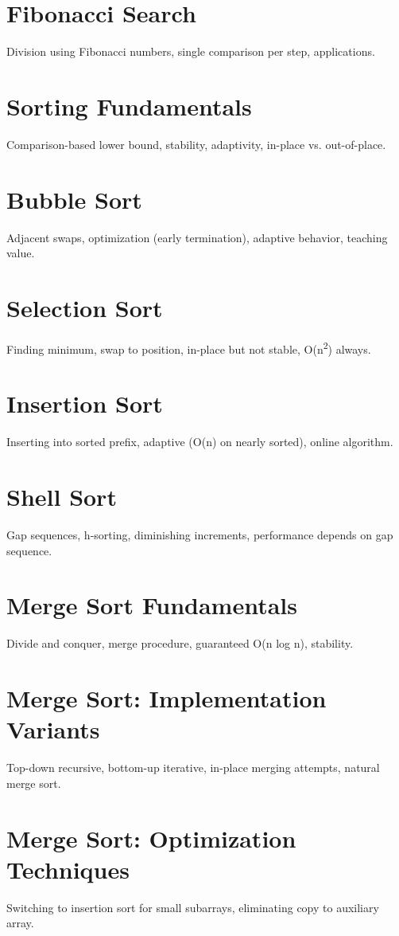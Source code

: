 \chapter{Fibonacci Search}
Division using Fibonacci numbers, single comparison per step, applications.

\chapter{Sorting Fundamentals}
Comparison-based lower bound, stability, adaptivity, in-place vs. out-of-place.

\chapter{Bubble Sort}
Adjacent swaps, optimization (early termination), adaptive behavior, teaching value.

\chapter{Selection Sort}
Finding minimum, swap to position, in-place but not stable, O(n\textsuperscript{2}) always.

\chapter{Insertion Sort}
Inserting into sorted prefix, adaptive (O(n) on nearly sorted), online algorithm.

\chapter{Shell Sort}
Gap sequences, h-sorting, diminishing increments, performance depends on gap sequence.

\chapter{Merge Sort Fundamentals}
Divide and conquer, merge procedure, guaranteed O(n log n), stability.

\chapter{Merge Sort: Implementation Variants}
Top-down recursive, bottom-up iterative, in-place merging attempts, natural merge sort.

\chapter{Merge Sort: Optimization Techniques}
Switching to insertion sort for small subarrays, eliminating copy to auxiliary array.

